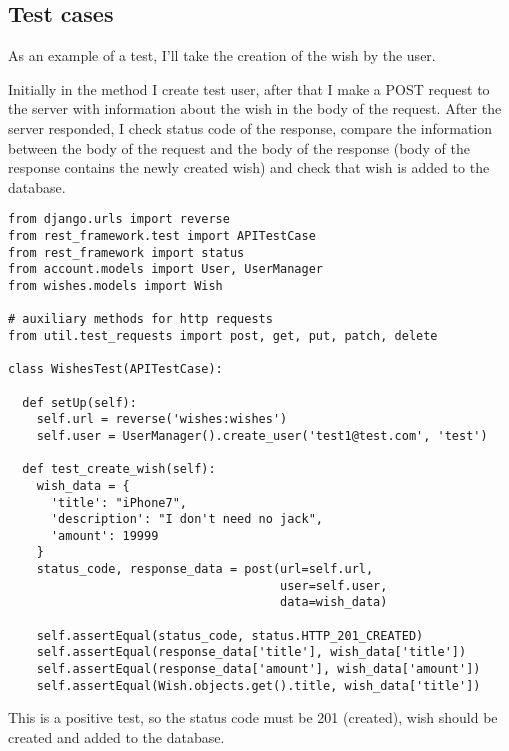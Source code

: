 \subsection{Test cases}
As an example of a test, I'll take the creation of the wish by the user.

Initially in the method  I create test user, after that I make a POST request to the server with
information about the wish in the body of the request. After the server responded, I check status code of the response,
compare the information between the body of the request and the body of the response (body of the response contains
the newly created wish) and check that wish is added to the database.

\begin{lstlisting}
from django.urls import reverse
from rest_framework.test import APITestCase
from rest_framework import status
from account.models import User, UserManager
from wishes.models import Wish

# auxiliary methods for http requests
from util.test_requests import post, get, put, patch, delete

class WishesTest(APITestCase):

  def setUp(self):
    self.url = reverse('wishes:wishes')
    self.user = UserManager().create_user('test1@test.com', 'test')

  def test_create_wish(self):
    wish_data = {
      'title': "iPhone7",
      'description': "I don't need no jack",
      'amount': 19999
    }
    status_code, response_data = post(url=self.url,
                                      user=self.user,
                                      data=wish_data)

    self.assertEqual(status_code, status.HTTP_201_CREATED)
    self.assertEqual(response_data['title'], wish_data['title'])
    self.assertEqual(response_data['amount'], wish_data['amount'])
    self.assertEqual(Wish.objects.get().title, wish_data['title'])

\end{lstlisting}

This is a positive test, so the status code must be 201 (created), wish should be created and added to the database.



\newcommand{\flag}[1]{
\item[]-\textbf{#1}
}

\newcommand{\bnitem}[1]{
\item\textbf{#1}.}
